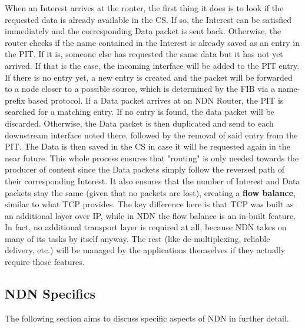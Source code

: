  
 When an Interest arrives at the router, the first thing it does is to look if the requested data is already available in the CS. If so, the Interest can be satisfied immediately and the corresponding Data packet is sent back. Otherwise, the router checks if the name contained in the Interest is already saved as an entry in the PIT. If it is, someone else has requested the same data but it has not yet arrived. If that is the case, the incoming interface will be added to the PIT entry. If there is no entry yet, a new entry is created and the packet will be forwarded to a node closer to a possible source, which is determined by the FIB via a name-prefix based protocol. If a Data packet arrives at an NDN Router, the PIT is searched for a matching entry. If no entry is found, the data packet will be discarded. Otherwise, the Data packet is then duplicated and send to each downstream interface noted there, followed by the removal of said entry from the PIT. The Data is then saved in the CS in case it will be requested again in the near future. This whole process ensures that "routing" is only needed towards the producer of content since the Data packets simply follow the reversed path of their corresponding Interest. It also ensures that the number of Interest and Data packets stay the same (given that no packets are lost), creating a \textbf{flow balance}, similar to what TCP provides. The key difference here is that TCP was built as an additional layer over IP, while in NDN the flow balance is an in-built feature. In fact, no additional transport layer is required at all, because NDN takes on many of its tasks by itself anyway. The rest (like de-multiplexing, reliable delivery, etc.) will be managed by the applications themselves if they actually require those features. \cite{ZABJ14}


\subsection{NDN Specifics}
The following section aims to discuss specific aspects of NDN in further detail. %

